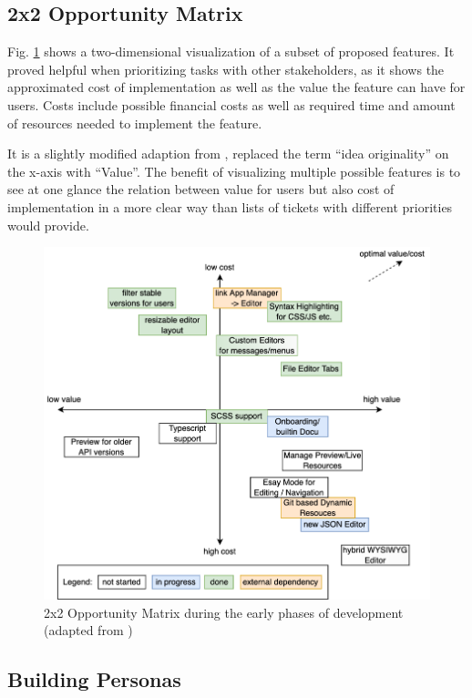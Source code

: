 \subsection{2x2 Opportunity Matrix}

Fig. \ref{fig:opportunitymatrix} shows a two-dimensional visualization of a subset of proposed features.
It proved helpful when prioritizing tasks with other stakeholders,
as it shows the approximated cost of implementation as well as the value the feature can have for users.
Costs include possible financial costs as well as required time and amount of resources needed to implement the feature.

It is a slightly modified adaption from \cite[p. 181]{LearnHCI:2020ys}, replaced the term ``idea originality'' on the x-axis with ``Value''.
The benefit of visualizing multiple possible features is to see at one glance the relation between value for users but also cost of implementation in a more clear way than lists of tickets with different priorities would provide.

\begin{figure}[h!]
	\centering
  \includegraphics[width=\textwidth]{pics/feature_cost_matrix.drawio.png}
	\caption{2x2 Opportunity Matrix during the early phases of development (adapted from \cite[p. 181]{LearnHCI:2020ys})}
	\label{fig:opportunitymatrix}
\end{figure}


\subsection{Building Personas}
\label{subsec:personas}

